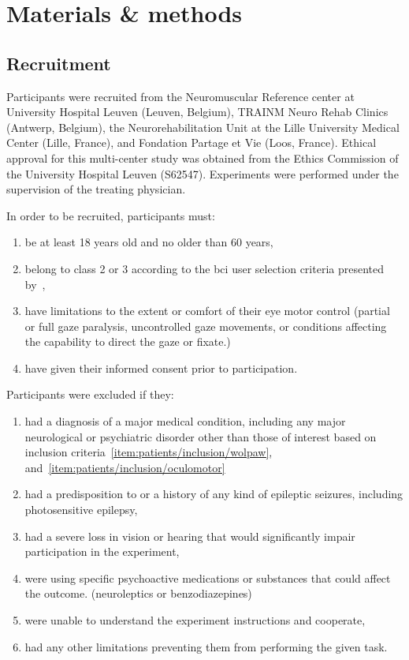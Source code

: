 \documentclass[twocolumn]{article}
\begin{document}
\section{Materials \& methods}
\subsection{Recruitment}
Participants were recruited from the Neuromuscular Reference center at
University Hospital Leuven (Leuven, Belgium), TRAINM Neuro Rehab Clinics
(Antwerp, Belgium), the Neurorehabilitation Unit at the Lille University
Medical Center (Lille, France), and Fondation Partage et Vie (Loos,
France).
Ethical approval for this multi-center study was obtained from the Ethics
Commission of the University Hospital Leuven (S62547).
Experiments were performed under the supervision of the treating physician.

In order to be recruited, participants must:
\begin{enumerate}
	\item be at least 18 years old and no older than 60
	      years,
	\item belong to class 2 or 3 according to the \ac{bci}	user selection criteria
	      presented by~\textcite{Wolpaw2006},
	      \label{item:patients/inclusion/wolpaw}
	\item have limitations to the extent or comfort of their eye motor control
	      (partial or full gaze paralysis, uncontrolled gaze movements, or conditions affecting the capability to direct the gaze or fixate.)
	      \label{item:patients/inclusion/oculomotor}
	\item have given their informed consent prior to participation.
\end{enumerate}
Participants were excluded if they:
\begin{enumerate}
	\item had a diagnosis of a major medical condition, including any major
	      neurological or psychiatric disorder other than those of interest based on
	      inclusion criteria~\ref{item:patients/inclusion/wolpaw},
	      and~\ref{item:patients/inclusion/oculomotor}\label{item:patients/exclusion/medical}
	\item had a predisposition to or a history of any kind of epileptic seizures,
	      including photosensitive epilepsy,\label{item:patients/exclusion/epilepsy}
	\item had a severe loss in vision or hearing that would significantly impair
	      participation in the experiment,\label{item:patients/exclusion/vision}
	\item were using specific psychoactive medications or substances that could affect the outcome.
	      (neuroleptics or benzodiazepines)
	      \label{item:patients/exclusion/cognitive}
	\item were unable to understand the experiment instructions and cooperate,
	\item had any other limitations preventing them from performing the given task.
\end{enumerate}
\end{document}
